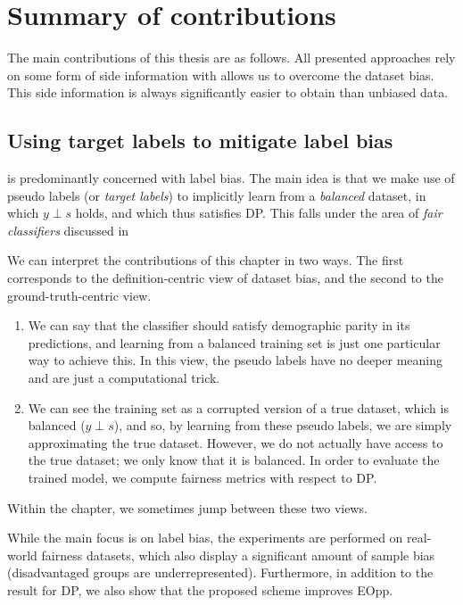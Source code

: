 \chapter{Summary of contributions}\label{ch:content}
The main contributions of this thesis are as follows.
All presented approaches rely on some form of side information with allows us to overcome the dataset bias.
This side information is always significantly easier to obtain than unbiased data.

\section{Using target labels to mitigate label bias}\label{sec:target-labels}
 is predominantly concerned with label bias.
The main idea is that we make use of pseudo labels (or \emph{target labels})
to implicitly learn from a \emph{balanced} dataset,
in which \(y\perp s\) holds, and which thus satisfies \acf{DP}.
This falls under the area of \emph{fair classifiers} discussed in 

We can interpret the contributions of this chapter in two ways.
The first corresponds to the definition-centric view of dataset bias,
and the second to the ground-truth-centric view.
\begin{enumerate}
  \item
    We can say that the classifier should satisfy demographic parity in its predictions,
    and learning from a balanced training set is just one particular way to achieve this.
    In this view, the pseudo labels have no deeper meaning and are just a computational trick.
  \item
    We can see the training set as a corrupted version of a true dataset, which is balanced (\(y\perp s\)),
    and so, by learning from these pseudo labels, we are simply approximating the true dataset.
    However, we do not actually have access to the true dataset; we only know that it is balanced.
    In order to evaluate the trained model, we compute fairness metrics with respect to \ac{DP}.
\end{enumerate}
Within the chapter, we sometimes jump between these two views.

While the main focus is on label bias,
the experiments are performed on real-world fairness datasets,
which also display a significant amount of sample bias (disadvantaged groups are underrepresented).
Furthermore, in addition to the result for \ac{DP}, we also show that the proposed scheme improves \acf{EOpp}.

